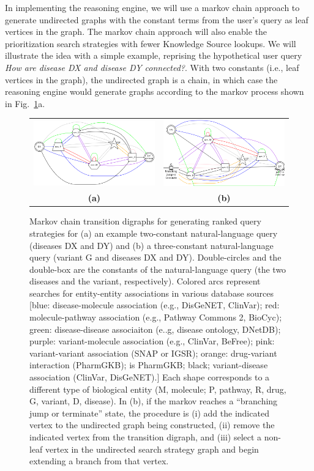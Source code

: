 \documentclass[11pt,notitlepage]{article}
\begin{document}
In implementing the reasoning engine, we will use a markov chain approach to
generate undirected graphs with the constant terms from the user's query as
leaf vertices in the graph. The markov chain approach will also enable the
prioritization search strategies with fewer Knowledge Source lookups.  We will
illustrate the idea with a simple example, reprising the hypothetical user query
{\em How are disease DX and disease DY connected?}. With two constants (i.e.,
leaf vertices in the graph), the undirected graph is a chain, in which case
the reasoning engine would generate graphs according to the markov process
shown in Fig.~\ref{fig:mp}a.
\begin{figure}[h!]
  \begin{tabular}{cc}
    \includegraphics[width=3in]{markov1.png} &
    \includegraphics[width=3in]{markov2.png} \\
                    {\bf (a)} & {\bf (b)}
  \end{tabular}
  \caption{Markov chain transition digraphs for generating ranked query
    strategies for (a) an example two-constant natural-language query (diseases
    DX and DY) and (b) a three-constant natural-language query (variant G and
    diseases DX and DY). Double-circles and the double-box are the constants of
    the natural-language query (the two diseases and the variant, respectively).
    Colored arcs represent searches for entity-entity associations in various
    database sources [blue: disease-molecule association (e.g., DisGeNET,
      ClinVar); red: molecule-pathway association (e.g., Pathway Commons 2,
      BioCyc); green: disease-disease associaiton (e..g, disease ontology,
      DNetDB); purple: variant-molecule association (e.g., ClinVar, BeFree);
      pink: variant-variant association (SNAP or IGSR); orange: drug-variant
      interaction (PharmGKB); is PharmGKB; black; variant-disease association
      (ClinVar, DisGeNET).] Each shape corresponds to a different type of
    biological entity (M, molecule; P, pathway, R, drug, G, variant, D,
    disease). In (b), if the markov reaches a ``branching jump or terminate''
    state, the procedure is (i) add the indicated vertex to the undirected graph
    being constructed, (ii) remove the indicated vertex from the transition
    digraph, and (iii) select a non-leaf vertex in the undirected search
    strategy graph and begin extending a branch from that vertex.}
  \label{fig:mp}    
\end{figure}
\end{document}
